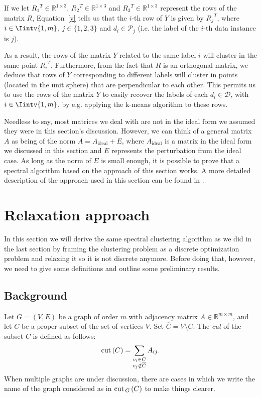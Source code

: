 If we let ${R_1}^T \in \mathbb{R}^{1 \times 3}$, ${R_2}^T \in \mathbb{R}^{1 \times 3}$ and ${R_3}^T \in \mathbb{R}^{1 \times 3}$ represent the rows of the matrix $R$, Equation~\vref{y} tells us that the $i$-th row of $Y$ is given by ${R_j} ^T$, where $i \in \Iintv{1,m}$, $j \in \{1, 2, 3 \}$ and $d_i \in \mathcal P_j$ (i.e. the label of the $i$-th data instance is $j$).

As a result, the rows of the matrix $Y$ related to the same label $i$ will cluster in the same point ${R_i}^T$.
Furthermore, from the fact that $R$ is an orthogonal matrix, we deduce that rows of $Y$ corresponding to different labels will cluster in points (located in the unit sphere) that are perpendicular to each other. 
This permits us to use the rows of the matrix $Y$ to easily recover the labels of each $d_i \in \mathcal D$, with $i \in \Iintv{1,m}$, by e.g. applying the k-means algorithm to these rows.

Needless to say, most matrices we deal with are not in the ideal form we assumed they were in this section's discussion.
However, we can think of a general matrix $A$ as being of the norm $A = A_{\text{ideal}} + E$, where $A_{\text{ideal}}$ is a matrix in the ideal form we discussed in this section and $E$ represents the perturbation from the ideal case.
As long as the norm of $E$ is small enough, it is possible to prove that a spectral algorithm based on the approach of this section works.
A more detailed description of the approach used in this section can be found in \cite{ng}.


\section{Relaxation approach}
In this section we will derive the same spectral clustering algorithm as we did in the last section by framing the clustering problem as a discrete optimization problem and relaxing it so it is not discrete anymore.
Before doing that, however, we need to give some definitions and outline some preliminary results.

\subsection{Background}

\begin{definition}
   Let $G = (V,E)$ be a graph of order $m$ with adjacency matrix $A \in \mathbb R^{m \times m}$, and let $C$ be a proper subset of the set of vertices $V$. 
   Set $\overline{C} = V \setminus C$.
   The \textit{cut} of the subset $C$ is defined as follows:
   \begin{equation}
      \operatorname{cut\,} (C) = \sum_{\substack{v_i \in C \\ v_j \notin \overline C }} A_{ij}.
   \end{equation}
   When multiple graphs are under discussion, there are cases in which we write the name of the graph considered as in $\operatorname{cut\,} _G \,(C)$ to make things clearer.
\end{definition}


